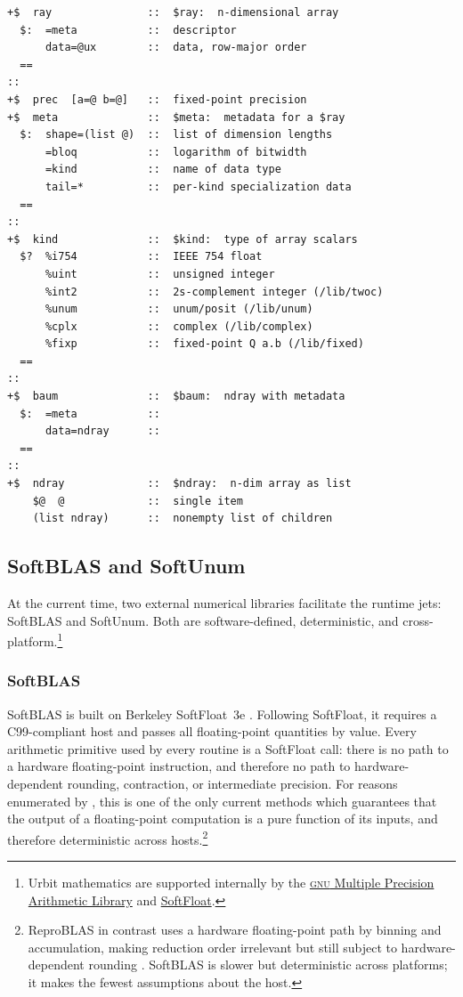 \documentclass[twoside]{article}
\begin{document}
\begin{lstlisting}[style=listingblock,
                   label=lst:ray,
                   caption={Lagoon base types.  From \texttt{/sur/lagoon}.},
                   float=p]
+$  ray               ::  $ray:  n-dimensional array
  $:  =meta           ::  descriptor
      data=@ux        ::  data, row-major order
  ==
::
+$  prec  [a=@ b=@]   ::  fixed-point precision
+$  meta              ::  $meta:  metadata for a $ray
  $:  shape=(list @)  ::  list of dimension lengths
      =bloq           ::  logarithm of bitwidth
      =kind           ::  name of data type
      tail=*          ::  per-kind specialization data
  ==
::
+$  kind              ::  $kind:  type of array scalars
  $?  %i754           ::  IEEE 754 float
      %uint           ::  unsigned integer
      %int2           ::  2s-complement integer (/lib/twoc)
      %unum           ::  unum/posit (/lib/unum)
      %cplx           ::  complex (/lib/complex)
      %fixp           ::  fixed-point Q a.b (/lib/fixed)
  ==
::
+$  baum              ::  $baum:  ndray with metadata
  $:  =meta           ::
      data=ndray      ::
  ==
::
+$  ndray             ::  $ndray:  n-dim array as list
    $@  @             ::  single item
    (list ndray)      ::  nonempty list of children
\end{lstlisting}

\subsection{SoftBLAS and SoftUnum}

At the current time, two external numerical libraries facilitate the runtime jets:  SoftBLAS and SoftUnum.  Both are software-defined, deterministic, and cross-platform.\footnote{Urbit mathematics are supported internally by the \href{https://gmplib.org/}{\textsc{gnu} Multiple Precision Arithmetic Library} and \href{https://www.jhauser.us/arithmetic/SoftFloat.html}{SoftFloat}.}

\subsubsection{SoftBLAS}
SoftBLAS is built on Berkeley SoftFloat~3e \citep{hauser_softfloat}.  Following SoftFloat, it requires a C99-compliant host and passes all floating-point quantities by value.  Every arithmetic primitive used by every routine is a SoftFloat call: there is no path to a hardware floating-point instruction, and therefore no path to hardware-dependent rounding, contraction, or intermediate precision.  For reasons enumerated by \citet{Davis2024}, this is one of the only current methods which guarantees that the output of a floating-point computation is a pure function of its inputs, and therefore deterministic across hosts.\footnote{ReproBLAS in contrast uses a hardware floating-point path by binning and accumulation, making reduction order irrelevant but still subject to hardware-dependent rounding \citep{demmel2013reproducible}.  SoftBLAS is slower but deterministic across platforms; it makes the fewest assumptions about the host.}
\end{document}

